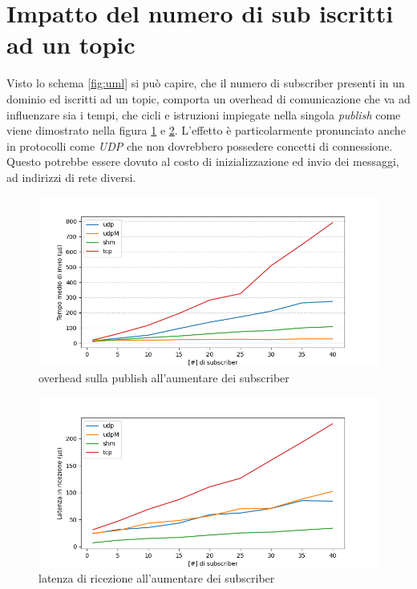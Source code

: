 \section{Impatto del numero di sub iscritti ad un topic}
Visto lo schema \ref{fig:uml} si può capire, che il numero di subscriber presenti in un dominio ed iscritti ad un topic, comporta un overhead di comunicazione che va ad influenzare sia i tempi, che cicli e istruzioni impiegate nella singola \emph{publish} come viene dimostrato nella figura \ref{fig:test3_overhead} e \ref{fig:test3_latenza}. L'effetto è particolarmente pronunciato anche in protocolli come \emph{UDP} che non dovrebbero possedere concetti di connessione. Questo potrebbe essere dovuto al costo di inizializzazione ed invio dei messaggi, ad indirizzi di rete diversi.
\begin{figure}[H]
    \centering
    \includegraphics[width=\textwidth]{./results/test3_sending_multiplesub.png} %
    \caption{overhead sulla publish all'aumentare dei subscriber}
    \label{fig:test3_overhead}
\end{figure}
\begin{figure}[H]
    \centering
    \includegraphics[width=\textwidth]{./results/test3_sendingreceiving_multiplesub.png} 
    \caption{latenza di ricezione all'aumentare dei subscriber}
    \label{fig:test3_latenza}
\end{figure}

